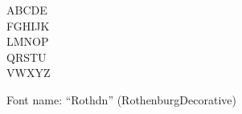 \documentclass[a4paper]{article}
\begin{document}
\begin{center}
\fontsize{60pt}{72pt}
  ABCDE \\
  FGHIJK \\
  LMNOP \\
  QRSTU \\
  VWXYZ \\
\end{center}
\vfill
\begin{center}
Font name: ``Rothdn'' (RothenburgDecorative)
\end{center}
\end{document}
